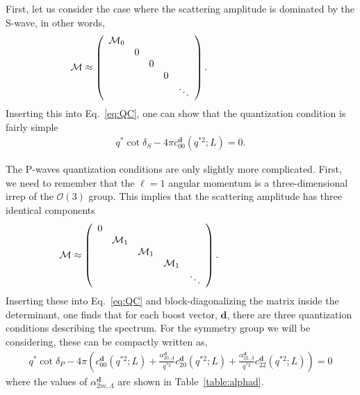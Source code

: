 First, let us consider the case where the scattering amplitude is dominated by the S-wave, in other words, 
 \begin{align}
 \hspace{-2cm}
\mathcal M
\approx
\left(
\begin{array}{cccccc}
 \mathcal M_{0} 
 \\
& 0
 \\
&& 0
 \\
&&&0
\\
&&&& \ddots
\\
\end{array}
\right). \hspace{1cm}
 \end{align}
Inserting this into Eq.~\ref{eq:QC}, one can show that the quantization condition is fairly simple
\begin{align}
q^{*}\cot\delta_{S}-
{4\pi}
 c^\mathbf{d}_{00}(q^{*2};L)=0.
 \label{eq:Swave}
\end{align}
{}

The P-waves quantization conditions are only slightly more complicated. First, we need to remember that the $\ell=1$ angular momentum is a three-dimensional irrep of the $\mathcal{O}(3)$ group. This implies that the scattering amplitude has three identical components
 \begin{align}
 \hspace{-2cm}
\mathcal M
\approx
\left(
\begin{array}{cccccc}
  0
 \\
& \mathcal M_{1} 
 \\
&& \mathcal M_{1} 
 \\
&&&\mathcal M_{1} 
\\
&&&& \ddots
\\
\end{array}
\right). \hspace{1cm}
 \end{align}
 Inserting these into Eq.~\ref{eq:QC} and block-diagonalizing the matrix inside the determinant, one finds that for each boost vector, $\mathbf{d}$, there are three quantization conditions describing the spectrum. For the symmetry group we will be considering, these can be compactly written as, 
\begin{align}
q^{*}\cot\delta_{P}-
{4\pi}\left(
 c^\mathbf{d}_{00}(q^{*2};L)
+\frac{\alpha_{20,\Lambda}^\mathbf{d}}{q^{*2}} c^\mathbf{d}_{20}(q^{*2};L)
+\frac{\alpha_{22,\Lambda}^\mathbf{d}
}{q^{*2}} c^\mathbf{d}_{22}(q^{*2};L)
\right)=0
\end{align}
where the values of $\alpha_{2m,\Lambda}^\mathbf{d}$ are shown in Table~\ref{table:alphad}. 


